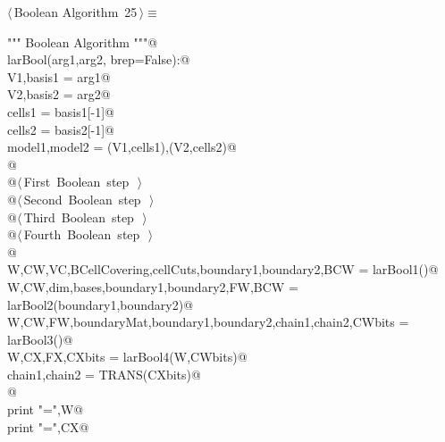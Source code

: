 \documentclass[11pt,oneside]{article}	%
\begin{document}
\begin{flushleft} \small \label{scrap32}
\protect{}$\langle\,$Boolean Algorithm\nobreak\ {\footnotesize 25}$\,\rangle\equiv$
\vspace{-1ex}
\begin{list}{}{} \item
\mbox{}\verb@""" Boolean Algorithm """@\\
\mbox{}\verb@def larBool(arg1,arg2, brep=False):@\\
\mbox{}\verb@   V1,basis1 = arg1@\\
\mbox{}\verb@   V2,basis2 = arg2@\\
\mbox{}\verb@   cells1 = basis1[-1]@\\
\mbox{}\verb@   cells2 = basis2[-1]@\\
\mbox{}\verb@   model1,model2 = (V1,cells1),(V2,cells2)@\\
\mbox{}\verb@   @\\
\mbox{}\verb@   @\hbox{$\langle\,$First Boolean step\nobreak\ {\footnotesize {}}$\,\rangle$}\verb@@\\
\mbox{}\verb@   @\hbox{$\langle\,$Second Boolean step\nobreak\ {\footnotesize {}}$\,\rangle$}\verb@@\\
\mbox{}\verb@   @\hbox{$\langle\,$Third Boolean step\nobreak\ {\footnotesize {}}$\,\rangle$}\verb@@\\
\mbox{}\verb@   @\hbox{$\langle\,$Fourth Boolean step\nobreak\ {\footnotesize {}}$\,\rangle$}\verb@@\\
\mbox{}\verb@      @\\
\mbox{}\verb@   W,CW,VC,BCellCovering,cellCuts,boundary1,boundary2,BCW = larBool1()@\\
\mbox{}\verb@   W,CW,dim,bases,boundary1,boundary2,FW,BCW = larBool2(boundary1,boundary2)@\\
\mbox{}\verb@   W,CW,FW,boundaryMat,boundary1,boundary2,chain1,chain2,CWbits = larBool3()@\\
\mbox{}\verb@   W,CX,FX,CXbits = larBool4(W,CWbits)@\\
\mbox{}\verb@   chain1,chain2 = TRANS(CXbits)@\\
\mbox{}\verb@   @\\
\mbox{}\verb@   print "\nW =",W@\\
\mbox{}\verb@   print "\nCX =",CX@\\

\end{list}
\end{flushleft}
\end{document}
